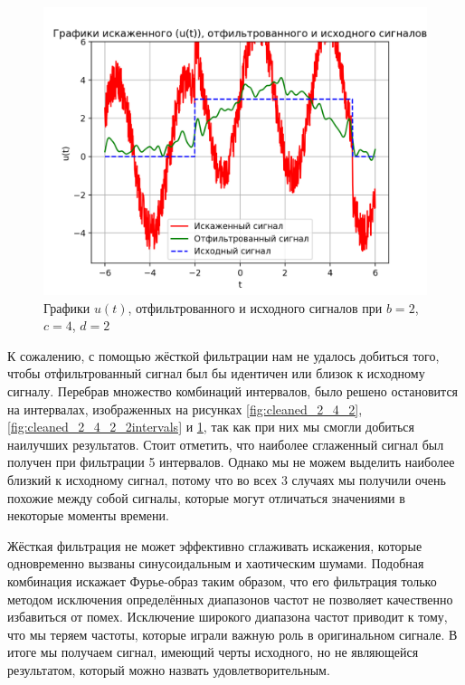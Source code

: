 \clearpage

\begin{figure}[ht!]
    \centering
    \includegraphics[scale=0.65]{media/1 task/specific_freq/Cleaned_2_4_2_-0,65:-0,153_-0,8044:-0,72_-1,3:-1,21_-2,07:-1,922_-2,67:-2,47.png}
    \caption{Графики  $u(t)$, отфильтрованного и исходного сигналов при $b=2$,  $c=4$,  $d=2$}
    \label{fig:cleaned_2_4_2_5intervals}
\end{figure}


К сожалению, с помощью жёсткой фильтрации нам не удалось добиться того, чтобы отфильтрованный сигнал был бы идентичен или близок к исходному сигналу. Перебрав множество комбинаций интервалов, было решено остановится на интервалах, изображенных на рисунках \ref{fig:cleaned_2_4_2}, \ref{fig:cleaned_2_4_2_2intervals} и \ref{fig:cleaned_2_4_2_5intervals}, так как при них мы смогли добиться наилучших результатов. Стоит отметить, что наиболее сглаженный сигнал был получен при фильтрации 5 интервалов. Однако мы не можем выделить наиболее близкий к исходному сигнал, потому что во всех 3 случаях мы получили очень похожие между собой сигналы, которые могут отличаться значениями в некоторые моменты времени.

Жёсткая фильтрация не может эффективно сглаживать искажения, которые одновременно вызваны синусоидальным и хаотическим шумами. Подобная комбинация искажает Фурье-образ таким образом, что его фильтрация только методом исключения определённых диапазонов частот не позволяет качественно избавиться от помех. Исключение широкого диапазона частот приводит к тому, что мы теряем частоты, которые играли важную роль в оригинальном сигнале. В итоге мы получаем сигнал, имеющий черты исходного, но не являющейся результатом, который можно назвать удовлетворительным.
\clearpage

